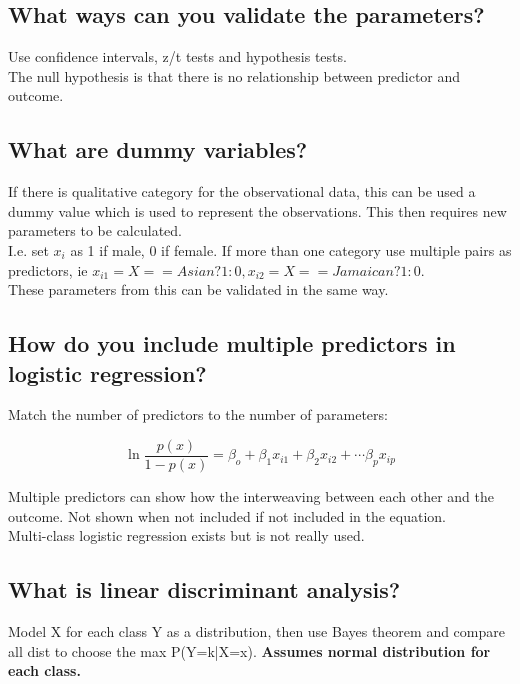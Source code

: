 \documentclass[11pt]{scrartcl} %
\begin{document}
\subsection{What ways can you validate the parameters?}

Use confidence intervals, z/t tests and hypothesis tests.\\

The null hypothesis is that there is no relationship between predictor and outcome.

\subsection{What are dummy variables?}

If there is qualitative category for the observational data, this can be used a dummy value which is used to represent
the observations. This then requires new parameters to be calculated.\\

I.e. set \(x_i\) as 1 if male, 0 if female. If more than one category use multiple pairs as predictors, ie 
\(x_{i1} = X==Asian?1:0, x_{i2} = X==Jamaican?1:0\).\\

These parameters from this can be validated in the same way.

\subsection{How do you include multiple predictors in logistic regression?}

Match the number of predictors to the number of parameters:

\begin{equation}
	\ln\frac{p(x)}{1-p(x)} = \beta_o + \beta_1x_{i1} + \beta_2x_{i2} + \cdots \beta_px_{ip}
\end{equation}

Multiple predictors can show how the interweaving between each other and the outcome. Not shown when not included if 
not included in the equation.\\

Multi-class logistic regression exists but is not really used.

\subsection{What is linear discriminant analysis?}

Model X for each class Y as a distribution, then use Bayes theorem and compare all dist to choose the max P(Y=k|X=x).
\textbf{Assumes normal distribution for each class.}
\end{document}
